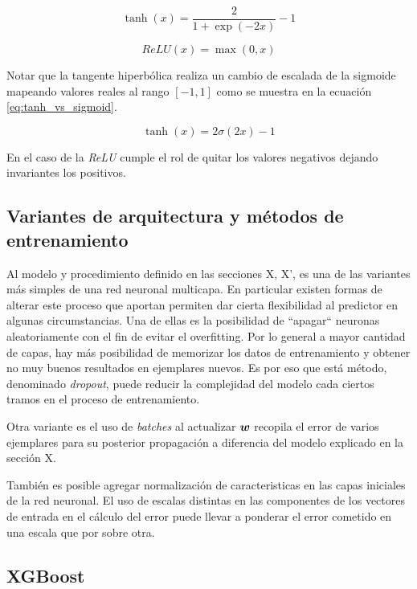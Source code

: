 \begin{equation}
    \tanh\left( x \right) = \frac{2}{1 + \exp(-2x)} - 1
\end{equation}

\begin{equation}
    ReLU\left( x \right) = \max(0, x)
\end{equation}

Notar que la tangente hiperbólica realiza un cambio de escalada de la sigmoide
mapeando valores reales al rango $[-1, 1]$ como se muestra en la ecuación \ref{eq:tanh_vs_sigmoid}.

\begin{equation} \label{eq:tanh_vs_sigmoid}
    \tanh\left( x \right) = 2 \sigma(2x) - 1
\end{equation}

En el caso de la \emph{ReLU} cumple el rol de quitar los valores negativos
dejando invariantes los positivos.

\subsection{Variantes de arquitectura y métodos de entrenamiento}

Al modelo y procedimiento definido en las secciones X, X', es una de las
variantes más simples de una red neuronal multicapa. En particular existen
formas de alterar este proceso que aportan permiten dar cierta flexibilidad al
predictor en algunas circumstancias. Una de ellas es la posibilidad de
``apagar`` neuronas aleatoriamente con el fin de evitar el overfitting. Por lo
general a mayor cantidad de capas, hay más posibilidad de memorizar los datos de
entrenamiento y obtener no muy buenos resultados en ejemplares nuevos. Es por
eso que está método, denominado \emph{dropout}, puede reducir la complejidad del
modelo cada ciertos tramos en el proceso de entrenamiento.

Otra variante es el uso de \emph{batches} al actualizar $\boldsymbol{w}$ recopila el
error de varios ejemplares para su posterior propagación a diferencia del modelo
explicado en la sección X.

También es posible agregar normalización de caracteristicas en las capas
iniciales de la red neuronal. El uso de escalas distintas en las componentes de
los vectores de entrada en el cálculo del error puede llevar a ponderar el error
cometido en una escala que por sobre otra.

\subsection{XGBoost}

